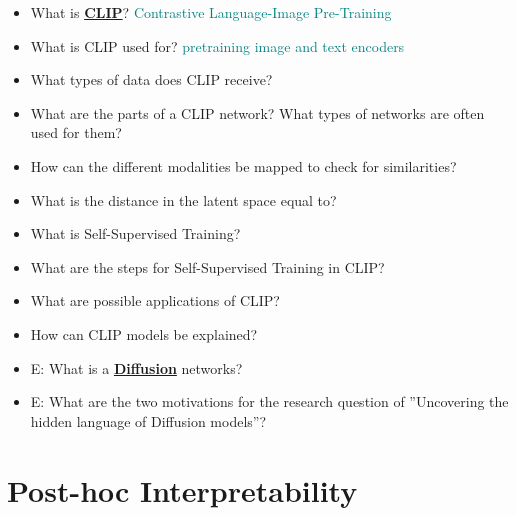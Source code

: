 \documentclass{report}
\newcommand{\asw}[2][teal]{}
\renewcommand{\asw}[2][teal]{\textcolor{#1}{#2}}
\begin{document}
\begin{itemize}
		\item What is \textbf{\underline{CLIP}}?
		\asw{\newline Contrastive Language-Image Pre-Training}
		\item What is CLIP used for?
		\asw{\newline pretraining image and text encoders}
		\item What types of data does CLIP receive?
		\asw{\newline }
		\item What are the parts of a CLIP network? What types of networks are often used for them?
		\asw{\newline }
		\item How can the different modalities be mapped to check for similarities?
		\asw{\newline }
		\item What is the distance in the latent space equal to?
		\asw{\newline }
		\item What is Self-Supervised Training?
		\asw{\newline }
		\item What are the steps for Self-Supervised Training in CLIP?
		\asw{\newline }
		\item What are possible applications of CLIP?
		\asw{\newline }
		\item How can CLIP models be explained?
		\asw{\newline }
		
		\item E: What is a \textbf{\underline{Diffusion}} networks?
		\asw{\newline }
		\item E: What are the two motivations for the research question of ”Uncovering the hidden language of Diffusion models”?
		\asw{\newline }
		
	\end{itemize}

	\section{Post-hoc Interpretability}
	
\end{document}
